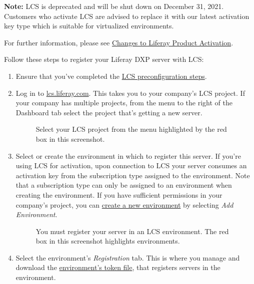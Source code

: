 \noindent\hrulefill

\textbf{Note:} LCS is deprecated and will be shut down on December 31,
2021. Customers who activate LCS are advised to replace it with our
latest activation key type which is suitable for virtualized
environments.

For further information, please see
\href{https://help.liferay.com/hc/en-us/articles/4402347960845-Changes-to-Liferay-Product-Activation}{Changes
to Liferay Product Activation}.

\noindent\hrulefill

Follow these steps to register your Liferay DXP server with LCS:

\begin{enumerate}
\def\labelenumi{\arabic{enumi}.}
\item
  Ensure that you've completed the
  \href{/docs/7-2/deploy/-/knowledge_base/d/lcs-preconfiguration}{LCS
  preconfiguration steps}.
\item
  Log in to \href{https://lcs.liferay.com}{lcs.liferay.com}. This takes
  you to your company's LCS project. If your company has multiple
  projects, from the menu to the right of the Dashboard tab select the
  project that's getting a new server.

  \begin{figure}
  \centering
  \caption{Select your LCS project from the menu highlighted by the red
  box in this screenshot.}
  \end{figure}
\item
  Select or create the environment in which to register this server. If
  you're using LCS for activation, upon connection to LCS your server
  consumes an activation key from the subscription type assigned to the
  environment. Note that a subscription type can only be assigned to an
  environment when creating the environment. If you have sufficient
  permissions in your company's project, you can
  \href{/docs/7-2/deploy/-/knowledge_base/d/managing-lcs-environments\#creating-environments}{create
  a new environment} by selecting \emph{Add Environment}.

  \begin{figure}
  \centering
  \caption{You must register your server in an LCS environment. The red
  box in this screenshot highlights environments.}
  \end{figure}
\item
  Select the environment's \emph{Registration} tab. This is where you
  manage and download the
  \href{/docs/7-2/deploy/-/knowledge_base/d/understanding-environment-tokens}{environment's
  token file}, that registers servers in the environment.


\end{enumerate}
